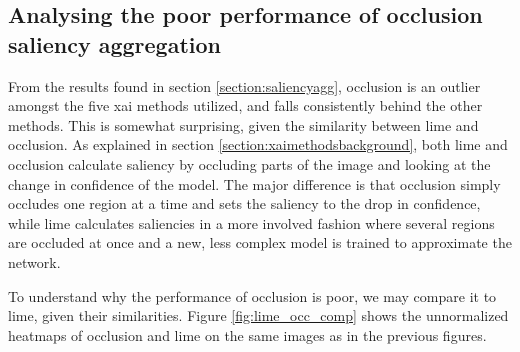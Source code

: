 \documentclass[UKenglish]{uiomasterthesis} %
\theoremstyle{definition}
\begin{document}
%

\subsection{Analysing the poor performance of occlusion saliency aggregation}

From the results found in section \ref{section:saliencyagg}, occlusion is an outlier amongst the five \ac{xai} methods utilized, and falls consistently behind the other methods. This is somewhat surprising, given the similarity between \ac{lime} and occlusion. As explained in section \ref{section:xaimethodsbackground}, both \ac{lime} and occlusion calculate saliency by occluding parts of the image and looking at the change in confidence of the model. The major difference is that occlusion simply occludes one region at a time and sets the saliency to the drop in confidence, while \ac{lime} calculates saliencies in a more involved fashion where several regions are occluded at once and a new, less complex model is trained to approximate the network.

To understand why the performance of occlusion is poor, we may compare it to \ac{lime}, given their similarities. Figure \ref{fig:lime_occ_comp} shows the unnormalized heatmaps of occlusion and \ac{lime} on the same images as in the previous figures.
\end{document}
